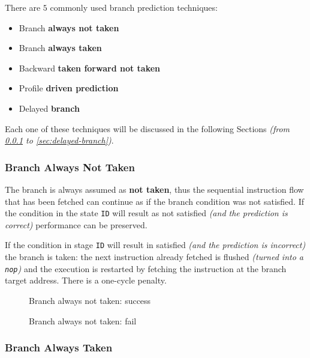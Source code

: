 \documentclass[english]{article}
\begin{document}
There are \(5\) commonly used branch prediction techniques:

\begin{itemize}
  \item Branch \textbf{always not taken}
  \item Branch \textbf{always taken}
  \item Backward \textbf{taken forward not taken}
  \item Profile \textbf{driven prediction}
  \item Delayed \textbf{branch}
\end{itemize}

Each one of these techniques will be discussed in the following Sections \textit{(from \ref{sec:branch-always-not-taken} to \ref{sec:delayed-branch})}.

\subsubsection{Branch Always Not Taken}
\label{sec:branch-always-not-taken}

The branch is always assumed as \textbf{not taken}, thus the sequential instruction flow that has been fetched can continue as if the branch condition was not satisfied.
If the condition in the state \texttt{ID} will result as not satisfied \textit{(and the prediction is correct)} performance can be preserved.

If the condition in stage \texttt{ID} will result in satisfied \textit{(and the prediction is incorrect)} the branch is taken: the next instruction already fetched is flushed \textit{(turned into a \texttt{nop})} and the execution is restarted by fetching the instruction at the branch target address.
There is a one-cycle penalty.

\begin{figure}[htbp]
  \bigskip
  \centering
  \caption{Branch always not taken: success}
  \label{fig:branch-always-not-taken}
  \bigskip
\end{figure}

\begin{figure}[htbp]
  \bigskip
  \centering
  \caption{Branch always not taken: fail}
  \label{fig:branch-always-not-taken-fail}
  \bigskip
\end{figure}

\subsubsection{Branch Always Taken}
\label{sec:branch-always-taken}
\end{document}
